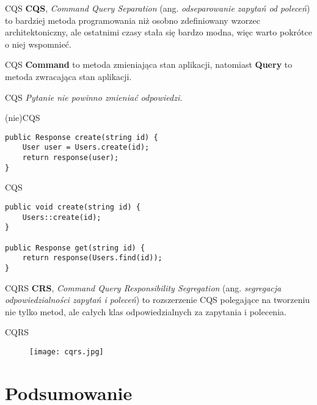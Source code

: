 \begin{frame}{CQS}
	\textbf{CQS}, \emph{Command Query Separation} (ang. \emph{odseparowanie zapytań od poleceń}) to bardziej metoda programowania niż osobno zdefiniowany wzorzec architektoniczny, ale ostatnimi czasy stała się bardzo modna, więc warto pokrótce o niej wspomnieć.
\end{frame}

\begin{frame}{CQS}
	\textbf{Command} to metoda zmieniająca stan aplikacji, natomiast \textbf{Query} to metoda zwracająca stan aplikacji.
\end{frame}

\begin{frame}{CQS}
	\emph{Pytanie nie powinno zmieniać odpowiedzi.}
\end{frame}

\begin{frame}[fragile]{(nie)CQS}
\begin{lstlisting}
public Response create(string id) {
    User user = Users.create(id);
    return response(user);
}
\end{lstlisting}
\end{frame}

\begin{frame}[fragile]{CQS}
\begin{lstlisting}
public void create(string id) {
    Users::create(id);
}

public Response get(string id) {
    return response(Users.find(id));
}
\end{lstlisting}
\end{frame}

\begin{frame}{CQRS}
	\textbf{CRS}, \emph{Command Query Responsibility Segregation} (ang. \emph{segregacja odpowiedzialności zapytań i poleceń}) to rozszerzenie CQS polegające na tworzeniu nie tylko metod, ale całych klas odpowiedzialnych za zapytania i polecenia.
\end{frame}

\begin{frame}{CQRS}
	\begin{figure}[t]
		\centering
		\texttt{[image: cqrs.jpg]}
	\end{figure}
\end{frame}

\section{Podsumowanie}

